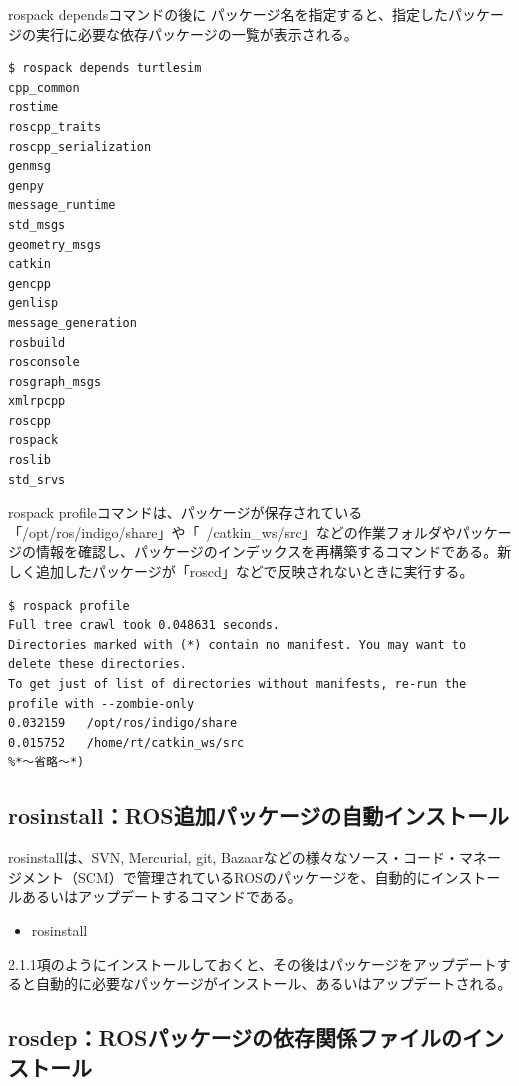 rospack dependsコマンドの後に パッケージ名を指定すると、指定したパッケージの実行に必要な依存パッケージの一覧が表示される。

\begin{lstlisting}[language=ROS]
$ rospack depends turtlesim
cpp_common
rostime
roscpp_traits
roscpp_serialization
genmsg
genpy
message_runtime
std_msgs
geometry_msgs
catkin
gencpp
genlisp
message_generation
rosbuild
rosconsole
rosgraph_msgs
xmlrpcpp
roscpp
rospack
roslib
std_srvs
\end{lstlisting}

rospack profileコマンドは、パッケージが保存されている「/opt/ros/indigo/share」や「~/catkin\_ws/src」などの作業フォルダやパッケージの情報を確認し、パッケージのインデックスを再構築するコマンドである。新しく追加したパッケージが「roscd」などで反映されないときに実行する。

\begin{lstlisting}[language=ROS]
$ rospack profile
Full tree crawl took 0.048631 seconds.
Directories marked with (*) contain no manifest. You may want to delete these directories.
To get just of list of directories without manifests, re-run the profile with --zombie-only
0.032159   /opt/ros/indigo/share
0.015752   /home/rt/catkin_ws/src
%*〜省略〜*)
\end{lstlisting}

\subsection{rosinstall：ROS追加パッケージの自動インストール}

rosinstallは、SVN, Mercurial, git, Bazaarなどの様々なソース・コード・マネージメント（SCM）で管理されているROSのパッケージを、自動的にインストールあるいはアップデートするコマンドである。

\begin{itemize}
\item rosinstall
\end{itemize}

2.1.1項のようにインストールしておくと、その後はパッケージをアップデートすると自動的に必要なパッケージがインストール、あるいはアップデートされる。

\subsection{rosdep：ROSパッケージの依存関係ファイルのインストール}

